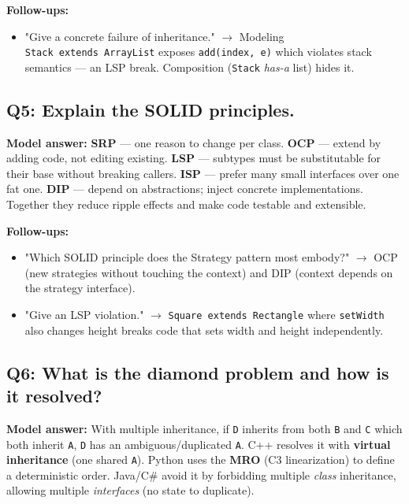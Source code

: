 \documentclass[11pt]{article}
\providecommand{\tightlist}{\setlength{\itemsep}{1pt}\setlength{\parskip}{0pt}}
\begin{document}
\textbf{Follow-ups:}

\begin{itemize}
\tightlist
\item
  "Give a concrete failure of inheritance." \(\rightarrow\) Modeling \texttt{Stack\ extends\ ArrayList} exposes \texttt{add(index,\ e)} which violates stack semantics --- an LSP break. Composition (\texttt{Stack} \emph{has-a} list) hides it.
\end{itemize}

\subsection{Q5: Explain the SOLID principles.}\label{q5-explain-the-solid-principles}

\textbf{Model answer:} \textbf{SRP} --- one reason to change per class. \textbf{OCP} --- extend by adding code, not editing existing. \textbf{LSP} --- subtypes must be substitutable for their base without breaking callers. \textbf{ISP} --- prefer many small interfaces over one fat one. \textbf{DIP} --- depend on abstractions; inject concrete implementations. Together they reduce ripple effects and make code testable and extensible.

\textbf{Follow-ups:}

\begin{itemize}
\tightlist
\item
  "Which SOLID principle does the Strategy pattern most embody?" \(\rightarrow\) OCP (new strategies without touching the context) and DIP (context depends on the strategy interface).
\item
  "Give an LSP violation." \(\rightarrow\) \texttt{Square\ extends\ Rectangle} where \texttt{setWidth} also changes height breaks code that sets width and height independently.
\end{itemize}

\subsection{Q6: What is the diamond problem and how is it resolved?}\label{q6-what-is-the-diamond-problem-and-how-is-it-resolved}

\textbf{Model answer:} With multiple inheritance, if \texttt{D} inherits from both \texttt{B} and \texttt{C} which both inherit \texttt{A}, \texttt{D} has an ambiguous/duplicated \texttt{A}. C++ resolves it with \textbf{virtual inheritance} (one shared \texttt{A}). Python uses the \textbf{MRO} (C3 linearization) to define a deterministic order. Java/C\# avoid it by forbidding multiple \emph{class} inheritance, allowing multiple \emph{interfaces} (no state to duplicate).
\end{document}
